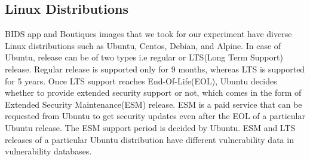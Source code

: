 \documentclass[a4paper,num-refs]{oup-contemporary}
\newcommand{\TG}[1]{\color{blue}From Tristan: #1\color{black}}
\begin{document}

\subsection{Linux Distributions}

BIDS app and Boutiques images that we took for our experiment have diverse Linux
distributions such as Ubuntu, Centos, Debian, and Alpine. In case of Ubuntu, release
can be of two types i.e regular or LTS(Long Term Support) release.
Regular release is supported only for 9 months, whereas LTS is supported for 5 years. Once LTS support
reaches End-Of-Life(EOL), Ubuntu decides whether to provide extended security support or not, which comes
in the form of Extended Security Maintenance(ESM) release.
ESM is a paid service that can be requested from Ubuntu to get security 
updates even after the EOL of a particular Ubuntu release. The ESM support period is decided by
Ubuntu. ESM and LTS releases of a particular Ubuntu distribution have different vulnerability
data in vulnerability databases.
\end{document}
